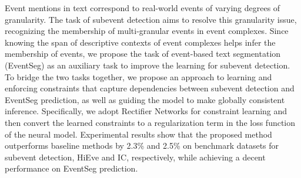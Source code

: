 Event mentions in text correspond to real-world events of varying degrees of granularity. The task of subevent detection aims to resolve this granularity issue, recognizing the membership of multi-granular events in event complexes. Since knowing the span of descriptive contexts of event complexes helps infer the membership of events, we propose the task of event-based text segmentation (EventSeg) as an auxiliary task to improve the learning for subevent detection. To bridge the two tasks together, we propose an approach to learning and enforcing constraints that capture dependencies between subevent detection and EventSeg prediction, as well as guiding the model to make globally consistent inference. Specifically, we adopt Rectifier Networks for constraint learning and then convert the learned constraints to a regularization term in the loss function of the neural model. Experimental results show that the proposed method outperforms baseline methods by 2.3\% and 2.5\% on benchmark datasets for subevent detection, HiEve and IC, respectively, while achieving a decent performance on EventSeg prediction.
